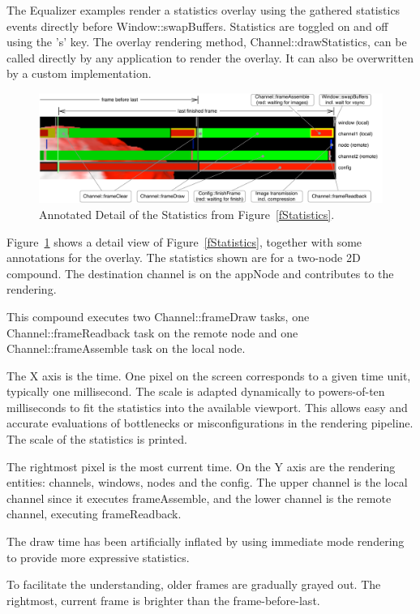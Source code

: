\documentclass[10pt,a4]{scrartcl}
\newcommand{\fig}[1]{Figure~\ref{#1}}
\begin{document}
The Equalizer examples render a statistics overlay using the gathered
statistics events directly before
\textsf{Window::swapBuffers}. Statistics are toggled on and off using
the 's' key. The overlay rendering method,
\textsf{Channel::drawStatistics}, can be called directly by any
application to render the overlay. It can also be overwritten by a
custom implementation.

\begin{figure}[h!t]
  \includegraphics[width=\textwidth]{images/statisticsDetail.pdf}
    {\caption{\label{fStatisticsDetail}Annotated Detail of the
        Statistics from \fig{fStatistics}.}}
\end{figure}

\fig{fStatisticsDetail} shows a detail view of \fig{fStatistics},
together with some annotations for the overlay. The statistics shown are
for a two-node 2D compound. The destination channel is on the
\textsf{appNode} and contributes to the rendering.

This compound executes two \textsf{Channel::frameDraw} tasks, one
\textsf{Channel::frame\-Read\-back} task on the remote node and one
\textsf{Channel::frameAssemble} task on the local node.

The X axis is the time. One pixel on the screen corresponds to a given
time unit, typically one millisecond. The scale is adapted dynamically
to powers-of-ten milliseconds to fit the statistics into the available
viewport. This allows easy and accurate evaluations of bottlenecks or
misconfigurations in the rendering pipeline. The scale of the statistics
is printed.

The rightmost pixel is the most current time. On the Y axis are the
rendering entities: channels, windows, nodes and the config. The upper
channel is the local channel since it executes \textsf{frameAssemble},
and the lower channel is the remote channel, executing {frameReadback}.

The draw time has been artificially inflated by using immediate mode
rendering to provide more expressive statistics.

To facilitate the understanding, older frames are gradually grayed
out. The rightmost, current frame is brighter than the
frame-before-last.
\end{document}
